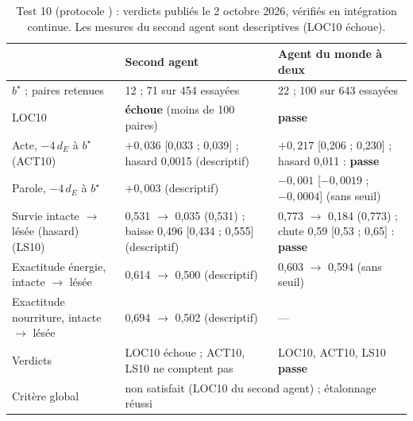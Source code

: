 \documentclass[11pt,a4paper]{article}
\newcommand{\passe}{\textbf{passe}}
\newcommand{\dE}{d_{E}}
\newcommand{\code}[1]{\texttt{\detokenize{#1}}}
\begin{document}
\begin{table}[t]
\centering
\caption{Test 10 (protocole \code{12b4d2d}) : verdicts publiés le 2 octobre 2026,
vérifiés en intégration continue. Les mesures du second agent sont descriptives
(LOC10 échoue).}
\label{tab-t10}
\small
\begin{tabularx}{\textwidth}{@{}l X X@{}}
\toprule
& Second agent & Agent du monde à deux \\
\midrule
$b^\star$ ; paires retenues & 12 ; 71 sur 454 essayées & 22 ; 100 sur 643 essayées \\
LOC10 & \textbf{échoue} (moins de 100 paires) & \passe \\
Acte, $-4\,\dE$ à $b^\star$ (ACT10) & $+0,036$ [0,033 ; 0,039] ; hasard 0,0015 (descriptif) & $+0,217$ [0,206 ; 0,230] ; hasard 0,011 : \passe \\
Parole, $-4\,\dE$ à $b^\star$ & $+0,003$ (descriptif) & $-0,001$ [$-0,0019$ ; $-0,0004$] (sans seuil) \\
Survie intacte $\to$ lésée (hasard) (LS10) & 0,531 $\to$ 0,035 (0,531) ; baisse 0,496 [0,434 ; 0,555] (descriptif) & 0,773 $\to$ 0,184 (0,773) ; chute 0,59 [0,53 ; 0,65] : \passe \\
Exactitude énergie, intacte $\to$ lésée & 0,614 $\to$ 0,500 (descriptif) & 0,603 $\to$ 0,594 (sans seuil) \\
Exactitude nourriture, intacte $\to$ lésée & 0,694 $\to$ 0,502 (descriptif) & --- \\
\midrule
Verdicts & LOC10 échoue ; ACT10, LS10 ne comptent pas & LOC10, ACT10, LS10 \passe{} \\
Critère global & \multicolumn{2}{l}{non satisfait (LOC10 du second agent) ; étalonnage réussi} \\
\bottomrule
\end{tabularx}
\end{table}
\end{document}
